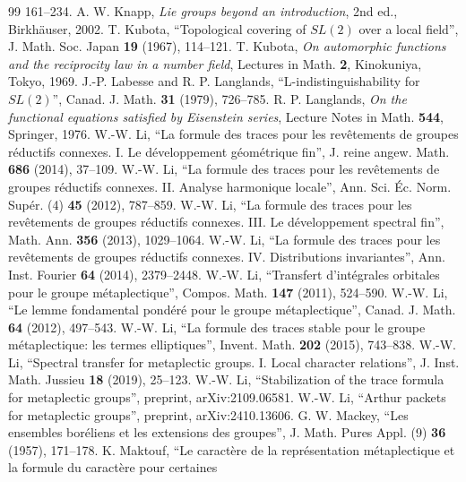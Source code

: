 \documentclass[11pt]{article}
\numberwithin{equation}{section}
\theoremstyle{plain}
\theoremstyle{definition}
\theoremstyle{remark}
\begin{document}
\begin{thebibliography}{99}
161--234.
 A. W. Knapp, \emph{Lie groups beyond an introduction}, 2nd ed.,
Birkh\"auser, 2002.
 T. Kubota, ``Topological covering of $SL(2)$ over a local
field'', J. Math. Soc. Japan \textbf{19} (1967), 114--121.
 T. Kubota, \emph{On automorphic functions and the reciprocity
law in a number field}, Lectures in Math. \textbf{2}, Kinokuniya, Tokyo, 1969.
 J.-P. Labesse and R. P. Langlands, ``L-indistinguishability
for $SL(2)$'', Canad. J. Math. \textbf{31} (1979), 726--785.
 R. P. Langlands, \emph{On the functional equations satisfied
by Eisenstein series}, Lecture Notes in Math. \textbf{544}, Springer, 1976.
 W.-W. Li, ``La formule des traces pour les rev\^etements
de groupes r\'eductifs connexes. I. Le d\'eveloppement g\'eom\'etrique fin'',
J. reine angew. Math. \textbf{686} (2014), 37--109.
 W.-W. Li, ``La formule des traces pour les rev\^etements
de groupes r\'eductifs connexes. II. Analyse harmonique locale'', Ann. Sci.
\'Ec. Norm. Sup\'er. (4) \textbf{45} (2012), 787--859.
 W.-W. Li, ``La formule des traces pour les
rev\^etements de groupes r\'eductifs connexes. III. Le d\'eveloppement
spectral fin'', Math. Ann. \textbf{356} (2013), 1029--1064.
 W.-W. Li, ``La formule des traces pour les rev\^etements
de groupes r\'eductifs connexes. IV. Distributions invariantes'', Ann. Inst.
Fourier \textbf{64} (2014), 2379--2448.
 W.-W. Li, ``Transfert d'int\'egrales orbitales pour le
groupe m\'etaplectique'', Compos. Math. \textbf{147} (2011), 524--590.
 W.-W. Li, ``Le lemme fondamental pond\'er\'e pour le
groupe m\'etaplectique'', Canad. J. Math. \textbf{64} (2012), 497--543.
 W.-W. Li, ``La formule des traces stable pour le groupe
m\'etaplectique: les termes elliptiques'', Invent. Math. \textbf{202}
(2015), 743--838.
 W.-W. Li, ``Spectral transfer for metaplectic groups.
I. Local character relations'', J. Inst. Math. Jussieu \textbf{18} (2019),
25--123.
 W.-W. Li, ``Stabilization of the trace formula for
metaplectic groups'', preprint, arXiv:2109.06581.
 W.-W. Li, ``Arthur packets for metaplectic groups'',
preprint, arXiv:2410.13606.
 G. W. Mackey, ``Les ensembles bor\'eliens et les
extensions des groupes'', J. Math. Pures Appl. (9) \textbf{36} (1957),
171--178.
 K. Maktouf, ``Le caract\`ere de la repr\'esentation
m\'etaplectique et la formule du caract\`ere pour certaines

\end{thebibliography}
\end{document}
